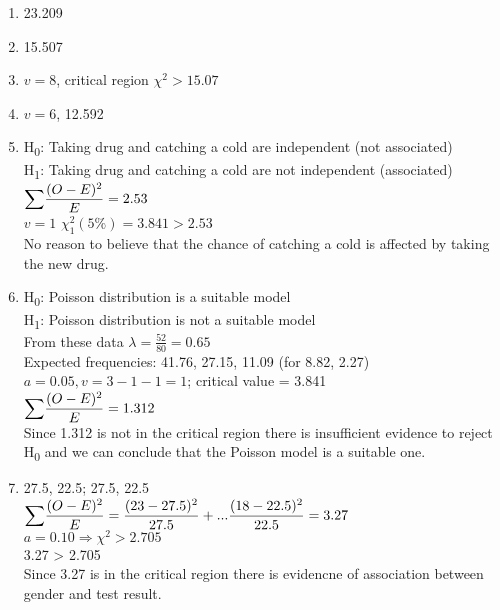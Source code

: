 \documentclass[fleqn]{article}
\begin{document}
\newpage
{}
\begin{enumerate}
    \setlength\itemsep{0.5em}
    \item 23.209
    \item 15.507
    \item $v=8$, critical region $\chi^2>15.07$
    \item $v=6$, 12.592
    \item H\textsubscript{0}: Taking drug and catching a cold are independent (not associated) \\
        H\textsubscript{1}: Taking drug and catching a cold are not independent (associated) \vspace{1mm}\\
        ${\mathlarger\sum}\dfrac{(O-E)^2}{E}=2.53$ \vspace{2mm}\\
        $v=1$ \hspace{2mm} $\chi_1^2(5\%)=3.841>2.53$ \\
        No reason to believe that the chance of catching a cold is affected by taking the new drug.
    \item H\textsubscript{0}: Poisson distribution is a suitable model \\
        H\textsubscript{1}: Poisson distribution is not a suitable model \\
        From these data $\lambda=\tfrac{52}{80}=0.65$ \\
        Expected frequencies: 41.76, 27.15, 11.09 (for 8.82, 2.27) \\
        $a=0.05, v=3-1-1=1$; critical value = 3.841 \vspace{1mm}\\
        ${\mathlarger\sum}\dfrac{(O-E)^2}{E}=1.312$ \vspace{2mm}\\
        Since 1.312 is not in the critical region there is insufficient evidence to reject H\textsubscript{0} and we can conclude that the Poisson model is a suitable one.
        
    \item 27.5, 22.5; 27.5, 22.5 \vspace{1mm}\\
        ${\mathlarger\sum}\dfrac{(O-E)^2}{E}=\dfrac{(23-27.5)^2}{27.5}+...\dfrac{(18-22.5)^2}{22.5}=3.27$ \vspace{2mm}\\
        $a=0.10 \Rightarrow \chi^2>2.705$ \\
        3.27 > 2.705 \\
        Since 3.27 is in the critical region there is evidencne of association between gender and test result.
        

\end{enumerate}
\end{document}
